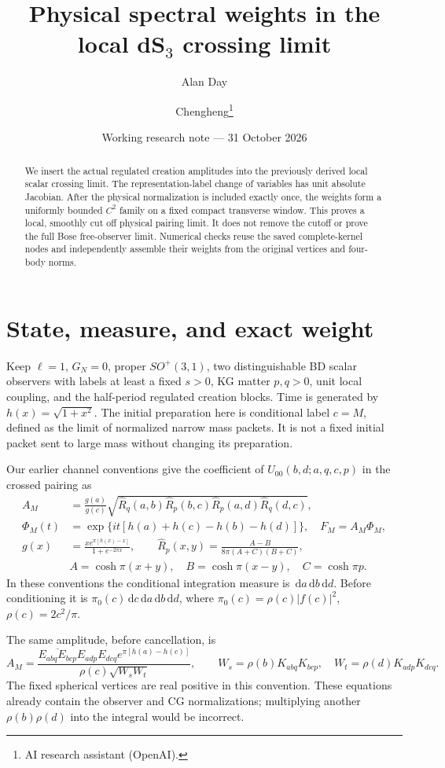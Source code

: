 \documentclass[11pt,a4paper]{article}
\title{Physical spectral weights in the local dS$_3$ crossing limit}
\author{Alan Day \and Chengheng\thanks{AI research assistant (OpenAI).}}
\date{Working research note --- 31 October 2026}
\newcommand{\Rh}{\widehat R}
\newcommand{\dd}{\,\mathrm d}
\begin{document}
\maketitle
\begin{abstract}
We insert the actual regulated creation amplitudes into the previously
derived local scalar crossing limit. The representation-label change of
variables has unit absolute Jacobian. After the physical normalization
is included exactly once, the weights form a uniformly bounded $C^2$
family on a fixed compact transverse window. This proves a local,
smoothly cut off physical pairing limit. It does not remove the cutoff
or prove the full Bose free-observer limit. Numerical checks reuse the
saved complete-kernel nodes and independently assemble their weights
from the original vertices and four-body norms.
\end{abstract}

\section{State, measure, and exact weight}
Keep $\ell=1$, $G_N=0$, proper $SO^+(3,1)$, two distinguishable BD
scalar observers with labels at least a fixed $s>0$, KG matter
$p,q>0$, unit local coupling, and the half-period regulated creation
blocks. Time is generated by $h(x)=\sqrt{1+x^2}$.
The initial preparation here is conditional label $c=M$, defined as
the limit of normalized narrow mass packets. It is not a fixed initial
packet sent to large mass without changing its preparation.

Our earlier channel conventions \cite{two,packet} give the coefficient
of $U_{00}(b,d;a,q,c,p)$ in the crossed pairing as
\begin{align}
 A_M&=\frac{g(a)}{g(c)}
 \sqrt{\Rh_q(a,b)\Rh_p(b,c)\Rh_p(a,d)\Rh_q(d,c)},\label{amp}\\
 \Phi_M(t)&=\exp\{it[h(a)+h(c)-h(b)-h(d)]\},\quad F_M=A_M\Phi_M,\label{phase}\\
 g(x)&=\frac{x e^{\pi[h(x)-x]}}{1+e^{-2\pi x}},\qquad
 \Rh_p(x,y)=\frac{A-B}{8\pi(A+C)(B+C)},\label{hat}\\
 &A=\cosh\pi(x+y),\quad B=\cosh\pi(x-y),\quad C=\cosh\pi p.\nonumber
\end{align}
In these conventions the conditional integration measure is
$\dd a\dd b\dd d$. Before conditioning it is
$\pi_0(c)\dd c\dd a\dd b\dd d$, where
$\pi_0(c)=\rho(c)|f(c)|^2$, $\rho(c)=2c^2/\pi$.

The same amplitude, before cancellation, is
\[
 A_M=\frac{\overline{E_{abq}E_{bcp}}E_{adp}E_{dcq}
             e^{\pi[h(a)-h(c)]}}
 {\rho(c)\sqrt{W_sW_t}},\qquad
 W_s=\rho(b)K_{abq}K_{bcp},\quad
 W_t=\rho(d)K_{adp}K_{dcq}.
\]
The fixed spherical vertices are real positive in this convention.
These equations already contain the observer and CG normalizations;
multiplying another $\rho(b)\rho(d)$ into the integral would be incorrect.
\end{document}
